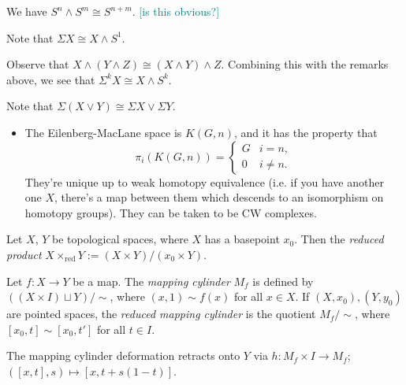 \documentclass{MetricNotes2023}
\def\textcolour{\textcolor}
\begin{document}
\begin{example}
We have \(S^n \wedge S^m\cong S^{n+m}\). \textcolour{teal}{[is this obvious?]}
\end{example}

\begin{remark}
Note that \(\Sigma X \cong X\wedge S^1\). 
\end{remark}

\begin{remark}\label{2503311142}
Observe that \(X\wedge (Y\wedge Z)\cong (X\wedge Y)\wedge Z\). Combining this with the remarks above, we see that \(\Sigma^kX\cong X\wedge S^k\). 
\end{remark}

\begin{remark}\label{2502211505}
Note that \(\Sigma(X\vee Y)\cong \Sigma X\vee \Sigma Y\).
\end{remark}

\begin{itemize}
\item The Eilenberg-MacLane space is \(K(G, n)\), and it has the property that 
\[\pi_i(K(G, n))=\begin{cases}
G & i=n,\\
0 & i\neq n.
\end{cases}\]
They're unique up to weak homotopy equivalence (i.e. if you have another one \(X\), there's a map between them which descends to an isomorphism on homotopy groups). They can be taken to be CW complexes. 
\end{itemize}

\begin{definition}
Let \(X\), \(Y\) be topological spaces, where \(X\) has a basepoint \(x_0\). Then the \textit{reduced product} \(X\times_{\text{red}}Y:=(X\times Y)/(x_0 \times Y)\). 
\end{definition}

\begin{definition}
Let \(f : X \to Y\) be a map. The \textit{mapping cylinder} \(M_f\) is defined by \(((X\times I)\sqcup Y)/\sim\), where \((x,1)\sim f(x)\) for all \(x \in X\). If \((X, x_0), (Y, y_0)\) are pointed spaces, the \textit{reduced mapping cylinder} is the quotient \(M_f/\sim\), where \([x_0, t]\sim [x_0, t']\) for all \( t\in I\).
\end{definition}

\begin{remark}\label{2503231306}
The mapping cylinder deformation retracts onto \(Y\) via \(h : M_f \times I\to M_f\); \(([x,t], s)\mapsto [x, t+s(1-t)]\). 
\end{remark}
\end{document}
